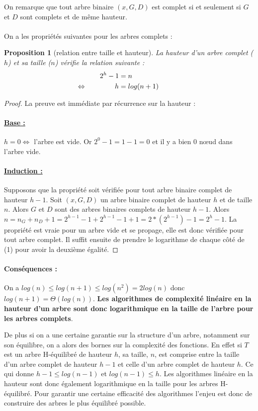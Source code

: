\documentclass{report}
\newtheorem*{petiteprop}{Proposition}
\begin{document}
On remarque que tout arbre binaire $(x,G,D)$ est complet si et seulement si $G$ et $D$ sont complets et de même hauteur.

\paragraph{}
On a les propriétés suivantes pour les arbres complets :
\begin{petiteprop}[relation entre taille et hauteur]
La hauteur d'un arbre complet ($h$) et sa taille ($n$) vérifie la relation suivante :
\begin{align}
2^h-1 &= n \\
\llap{$\Leftrightarrow$ \qquad \qquad} h &= log(n+1)
\end{align}
\end{petiteprop}

\begin{proof}
La preuve est immédiate par récurrence sur la hauteur :
\paragraph{\underline{Base :}}
$h = 0 \Leftrightarrow$ l'arbre est vide. Or $2^0-1 = 1-1 = 0$ et il y a bien 0 nœud dans l'arbre vide.
\paragraph{\underline{Induction :}}
Supposons que la propriété soit vérifiée pour tout arbre binaire complet de hauteur $h-1$.
Soit $(x,G,D)$ un arbre binaire complet de hauteur $h$ et de taille $n$. 
Alors $G$ et $D$ sont des arbres binaires complets de hauteur $h-1$. Alors $n = n_G + n_D + 1 = 2^{h-1}-1 + 2^{h-1}-1 + 1 = 2*(2^{h-1}) -1 = 2^h-1$.
La propriété est vraie pour un arbre vide et se propage, elle est donc vérifiée pour tout arbre complet. Il suffit ensuite de prendre le logarithme de chaque côté de (1) pour avoir la deuxième égalité. 
\end{proof}

\paragraph{Conséquences :} On a $log(n) \leq log(n+1) \leq log(n^2) = 2log(n)$ donc $log(n+1) = \Theta(log(n))$. \textbf{Les algorithmes de complexité linéaire en la hauteur d'un arbre sont donc logarithmique en la taille de l'arbre pour les arbres complets}.

De plus si on a une certaine garantie sur la structure d'un arbre, notamment sur son équilibre, on a alors des bornes sur la complexité des fonctions.
En effet si $T$ est un arbre H-équilibré de hauteur $h$, sa taille, $n$, est comprise entre la taille d'un arbre complet de hauteur $h-1$ et celle d'un arbre complet de hauteur $h$. 
Ce qui donne $h-1 \leq log(n-1)$ et $log(n-1) \leq h$.
Les algorithmes linéaire en la hauteur sont donc également logarithmique en la taille pour les arbres H-équilibré. Pour garantir une certaine efficacité des algorithmes l'enjeu est donc de construire des arbres le plus équilibré possible.
\end{document}
